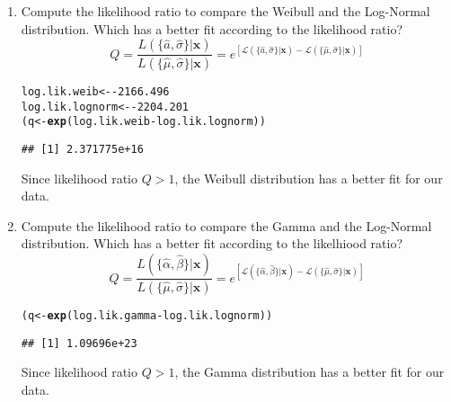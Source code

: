 \documentclass{article}\usepackage[]{graphicx}\usepackage[]{xcolor}
\makeatletter
\newcommand{\hlnum}[1]{\textcolor[rgb]{0.686,0.059,0.569}{#1}}%
\newcommand{\hlopt}[1]{\textcolor[rgb]{0,0,0}{#1}}%
\newcommand{\hldef}[1]{\textcolor[rgb]{0.345,0.345,0.345}{#1}}%
\newcommand{\hlkwb}[1]{\textcolor[rgb]{0.69,0.353,0.396}{#1}}%
\newcommand{\hlkwd}[1]{\textcolor[rgb]{0.737,0.353,0.396}{\textbf{#1}}}%
\newenvironment{kframe}{%
 \def\at@end@of@kframe{}%
 \ifinner\ifhmode%
  \def\at@end@of@kframe{\end{minipage}}%
  \begin{minipage}{\columnwidth}%
 \fi\fi%
 \def\FrameCommand##1{\hskip\@totalleftmargin \hskip-\fboxsep
 \colorbox{shadecolor}{##1}\hskip-\fboxsep
     \hskip-\linewidth \hskip-\@totalleftmargin \hskip\columnwidth}%
 \MakeFramed {\advance\hsize-\width
   \@totalleftmargin\z@ \linewidth\hsize
   \@setminipage}}%
 {\par\unskip\endMakeFramed%
 \at@end@of@kframe}
\newenvironment{knitrout}{}{} %
\makeatother
\begin{document}
\begin{enumerate}
\begin{enumerate}
    \item Compute the likelihood ratio to compare the Weibull and the Log-Normal distribution.
    Which has a better fit according to the likelihood ratio?
    \[Q = \frac{L(\{\hat{a}, \hat{\sigma}\}|\mathbf{x})}{L(\{\hat{\mu}, \hat{\sigma}\}|\mathbf{x})}=e^{\left[\mathcal{L}(\{\hat{a}, \hat{\sigma}\}|\mathbf{x}) - \mathcal{L}(\{\hat{\mu}, \hat{\sigma}\}|\mathbf{x})\right]}\]
\begin{knitrout}\scriptsize
{}\color{fgcolor}\begin{kframe}
\begin{alltt}
\hldef{log.lik.weib} \hlkwb{<-} \hlopt{-}\hlnum{2166.496}
\hldef{log.lik.lognorm} \hlkwb{<-} \hlopt{-}\hlnum{2204.201}
\hldef{(q} \hlkwb{<-} \hlkwd{exp}\hldef{(log.lik.weib} \hlopt{-} \hldef{log.lik.lognorm))}
\end{alltt}
\begin{verbatim}
## [1] 2.371775e+16
\end{verbatim}
\end{kframe}
\end{knitrout}
  Since likelihood ratio $Q > 1$, the Weibull distribution has a better fit for our data. 
    \item Compute the likelihood ratio to compare the Gamma and the Log-Normal distribution.
    Which has a better fit according to the likelhiood ratio?
    \[Q = \frac{L(\{\hat{\alpha}, \hat{\beta}\}|\mathbf{x})}{L(\{\hat{\mu}, \hat{\sigma}\}|\mathbf{x})}=e^{\left[\mathcal{L}(\{\hat{\alpha}, \hat{\beta}\}|\mathbf{x}) - \mathcal{L}(\{\hat{\mu}, \hat{\sigma}\}|\mathbf{x})\right]}\]
\begin{knitrout}\scriptsize
{}\color{fgcolor}\begin{kframe}
\begin{alltt}
\hldef{(q} \hlkwb{<-} \hlkwd{exp}\hldef{(log.lik.gamma} \hlopt{-} \hldef{log.lik.lognorm))}
\end{alltt}
\begin{verbatim}
## [1] 1.09696e+23
\end{verbatim}
\end{kframe}
\end{knitrout}
  Since likelihood ratio $Q > 1$, the Gamma distribution has a better fit for our data. 
    

\end{enumerate}
\end{enumerate}
\end{document}
